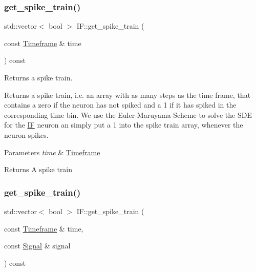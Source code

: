 \subsubsection{\texorpdfstring{get\+\_\+spike\+\_\+train()}{get\_spike\_train()}\hspace{0.1cm}{\footnotesize\ttfamily [1/4]}}
{\footnotesize\ttfamily std\+::vector$<$ bool $>$ I\+F\+::get\+\_\+spike\+\_\+train (\begin{DoxyParamCaption}\item[{const \hyperlink{classTimeframe}{Timeframe} \&}]{time }\end{DoxyParamCaption}) const}



Returns a spike train. 

Returns a spike train, i.\+e. an array with as many steps as the time frame, that contains a zero if the neuron has not spiked and a 1 if it has spiked in the corresponding time bin. We use the Euler-\/\+Maruyama-\/\+Scheme to solve the S\+DE for the \hyperlink{classIF}{IF} neuron an simply put a 1 into the spike train array, whenever the neuron spikes. 
\begin{DoxyParams}{Parameters}
{\em time} & \hyperlink{classTimeframe}{Timeframe} \\
\hline
\end{DoxyParams}
\begin{DoxyReturn}{Returns}
A spike train 
\end{DoxyReturn}
\mbox{\label{classIF_a36ae9ec5273d532febc1ceef8d9896f0}} 
\subsubsection{\texorpdfstring{get\+\_\+spike\+\_\+train()}{get\_spike\_train()}\hspace{0.1cm}{\footnotesize\ttfamily [2/4]}}
{\footnotesize\ttfamily std\+::vector$<$ bool $>$ I\+F\+::get\+\_\+spike\+\_\+train (\begin{DoxyParamCaption}\item[{const \hyperlink{classTimeframe}{Timeframe} \&}]{time,  }\item[{const \hyperlink{classSignal}{Signal} \&}]{signal }\end{DoxyParamCaption}) const}



